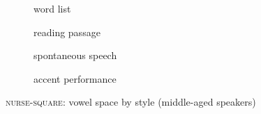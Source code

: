 \begin{figure}[h!]
	\centering
	\begin{subfigure}{.49\textwidth}
		\centering
			\resizebox{\linewidth}{!}{} 
		\caption{word list}
		\label{fig.nurse.space.mid.list}
	\end{subfigure}
	\begin{subfigure}{.49\textwidth}
		\centering
			\resizebox{\linewidth}{!}{} 
		\caption{reading passage}
		\label{fig.nurse.space.mid.read}
	\end{subfigure}
	
	\begin{subfigure}{.49\textwidth}
		\centering
			\resizebox{\linewidth}{!}{} 
		\caption{spontaneous speech}
		\label{fig.nurse.space.mid.free}
	\end{subfigure}
	\begin{subfigure}{.49\textwidth}
		\centering
			\resizebox{\linewidth}{!}{} 
		\caption{accent performance}
		\label{fig.nurse.space.mid.imit}
	\end{subfigure}
	
	\caption{\textsc{nurse}-\textsc{square}: vowel space by style (middle-aged speakers)}
	\label{fig.nurse.space.mid}
\end{figure}

